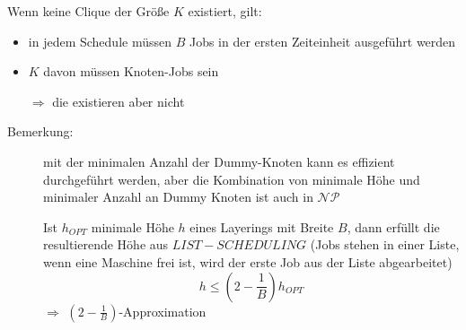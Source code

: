 Wenn keine Clique der Größe $K$ existiert, gilt:
	\begin{itemize}[itemsep=-1pt]
		\item in jedem Schedule  müssen $B$ Jobs in der ersten Zeiteinheit ausgeführt werden
		\item $K$ davon müssen Knoten-Jobs sein
		\item[$\Rightarrow$] die existieren aber nicht
	\end{itemize}
\begin{description}
	\item[Bemerkung:] mit der minimalen Anzahl der Dummy-Knoten kann es effizient durchgeführt werden, aber die Kombination von minimale Höhe und minimaler Anzahl an Dummy Knoten ist auch in $\mathcal{NP}$
	\item[]Ist $h_{OPT}$ minimale Höhe $h$ eines Layerings mit Breite $B$, dann erfüllt die resultierende Höhe aus $LIST-SCHEDULING$ (Jobs stehen in einer Liste, wenn eine Maschine frei ist, wird der erste Job aus der Liste abgearbeitet)
	\[h\leq (2-\frac{1}{B})h_{OPT}\]
	$\Rightarrow$ \glqq $(2-\frac{1}{B})$\grqq-Approximation
\end{description}